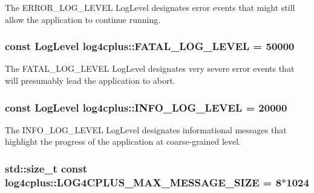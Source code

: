 The {\ttfamily E\-R\-R\-O\-R\-\_\-\-L\-O\-G\-\_\-\-L\-E\-V\-E\-L} Log\-Level designates error events that might still allow the application to continue running. \hypertarget{namespacelog4cplus_a76a5d06eac76291ab55ec042d81c028a}{
\subsubsection[{F\-A\-T\-A\-L\-\_\-\-L\-O\-G\-\_\-\-L\-E\-V\-E\-L}]{\setlength{\rightskip}{0pt plus 5cm}const {\bf Log\-Level} log4cplus\-::\-F\-A\-T\-A\-L\-\_\-\-L\-O\-G\-\_\-\-L\-E\-V\-E\-L = 50000}}\label{namespacelog4cplus_a76a5d06eac76291ab55ec042d81c028a}
The {\ttfamily F\-A\-T\-A\-L\-\_\-\-L\-O\-G\-\_\-\-L\-E\-V\-E\-L} Log\-Level designates very severe error events that will presumably lead the application to abort. \hypertarget{namespacelog4cplus_a4275eaa8f9ec01a87bfec24d6b87cdb6}{
\subsubsection[{I\-N\-F\-O\-\_\-\-L\-O\-G\-\_\-\-L\-E\-V\-E\-L}]{\setlength{\rightskip}{0pt plus 5cm}const {\bf Log\-Level} log4cplus\-::\-I\-N\-F\-O\-\_\-\-L\-O\-G\-\_\-\-L\-E\-V\-E\-L = 20000}}\label{namespacelog4cplus_a4275eaa8f9ec01a87bfec24d6b87cdb6}
The {\ttfamily I\-N\-F\-O\-\_\-\-L\-O\-G\-\_\-\-L\-E\-V\-E\-L} Log\-Level designates informational messages that highlight the progress of the application at coarse-\/grained level. \hypertarget{namespacelog4cplus_abc1ea0aa55de46cd49a9d952ba501a4b}{
\subsubsection[{L\-O\-G4\-C\-P\-L\-U\-S\-\_\-\-M\-A\-X\-\_\-\-M\-E\-S\-S\-A\-G\-E\-\_\-\-S\-I\-Z\-E}]{\setlength{\rightskip}{0pt plus 5cm}std\-::size\-\_\-t const log4cplus\-::\-L\-O\-G4\-C\-P\-L\-U\-S\-\_\-\-M\-A\-X\-\_\-\-M\-E\-S\-S\-A\-G\-E\-\_\-\-S\-I\-Z\-E = 8$\ast$1024}}\label{namespacelog4cplus_abc1ea0aa55de46cd49a9d952ba501a4b}
